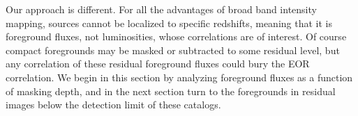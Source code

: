 \documentclass{emulateapj}
\begin{document}
Our approach is different. For all the advantages of broad band intensity mapping, sources cannot be localized to specific redshifts, meaning that it is foreground fluxes, not luminosities, whose correlations are of interest. Of course compact foregrounds may be masked or subtracted to some residual level, but any correlation of these residual foreground fluxes could bury the EOR correlation. We begin in this section by analyzing foreground fluxes as a function of masking depth, and in the next section turn to the foregrounds in residual images below the detection limit of these catalogs. %
\end{document}
